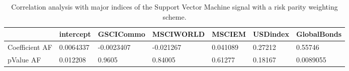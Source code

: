 \begin{table}[H]
\centering
\begin{tabular}{lllllll}
& intercept & GSCICommo & MSCIWORLD & MSCIEM & USDindex & GlobalBonds \\ 
\hline 
Coefficient AF & 0.0064337 & -0.0023407 & -0.021267 & 0.041089 & 0.27212 & 0.55746 \\ 
pValue AF & 0.012208 & 0.9605 & 0.84005 & 0.61277 & 0.18167 & 0.0089055 \\ 
\hline
\end{tabular}
\caption{Correlation analysis with major indices of the Support Vector Machine signal with a risk parity weighting scheme.}
\label{SVM_MODEL_Risk_AFACTOR}
\end{table}